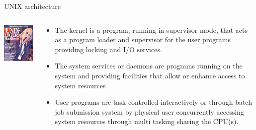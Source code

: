 \documentclass[unknownkeysallowed, 10pt, a4 paper, handout]{beamer}
\begin{document}
\begin{frame}[label=architecture]{UNIX architecture}
  \begin{columns}[T]
    \begin{column}{.23\textwidth}
      \includegraphics[scale=0.5]{pics/UNIX-HATERS_Handbook_cover_ISBN_1-56884-203-1.png}
    \end{column}
    \begin{column}{.73\textwidth}
      \begin{itemize}
      \item The kernel is a program, running in supervisor mode, that acts as a
        program loader and supervisor for the user programs providing locking
        and I/O services.
      \item The system services or daemons are programs running on the system
        and providing facilities that allow or enhance access to system
        resources
      \item User programs are task controlled interactively or through batch job
        submission system by physical user concurrently accessing system
        resources through multi tasking sharing the CPU(s).
    \end{itemize}
    \end{column}
  \end{columns}
\end{frame}


\end{document}
